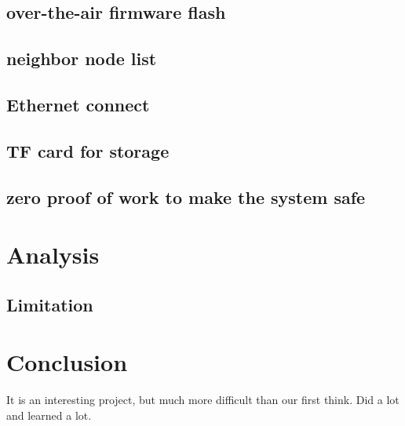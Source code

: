 \documentclass{article}
\begin{document}
    \subsection{over-the-air firmware flash}
    \subsection{neighbor node list}
    \subsection{Ethernet connect}
    \subsection{TF card for storage}
    \subsection{zero proof of work to make the system safe}

\section{Analysis}
    \subsection{Limitation}

\section{Conclusion}
    It is an interesting project, but much more difficult than our first think. Did a lot and learned a lot.




\end{document}
